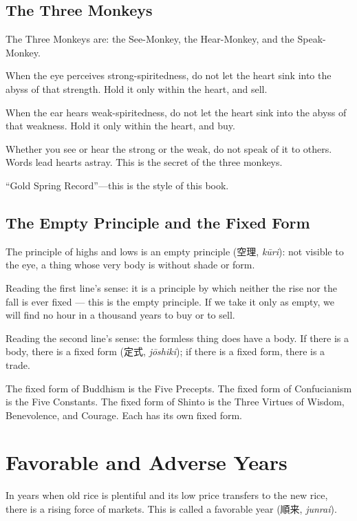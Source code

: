 \documentclass[10pt, openany]{book}
\newcommand{\jp}[1]{{\japanesefont #1}}
\begin{document}
\section{The Three Monkeys}

The Three Monkeys are: the See-Monkey, the Hear-Monkey, and the
Speak-Monkey.

When the eye perceives strong-spiritedness, do not let the heart
sink into the abyss of that strength. Hold it only within the
heart, and sell.

When the ear hears weak-spiritedness, do not let the heart sink
into the abyss of that weakness. Hold it only within the heart,
and buy.

Whether you see or hear the strong or the weak, do not speak of it
to others. Words lead hearts astray. This is the secret of the
three monkeys.

``Gold Spring Record''---this is the style of this book.

\section{The Empty Principle and the Fixed Form}

The principle of highs and lows is an empty principle
(\jp{空理}, \textit{k\=uri}): not visible to the eye, a thing whose
very body is without shade or form.

Reading the first line's sense: it is a principle by which neither
the rise nor the fall is ever fixed --- this is the empty principle.
If we take it only as empty, we will find no hour in a thousand
years to buy or to sell.

Reading the second line's sense: the formless thing does have a
body. If there is a body, there is a fixed form (\jp{定式},
\textit{j\=oshiki}); if there is a fixed form, there is a trade.

The fixed form of Buddhism is the Five Precepts. The fixed form of
Confucianism is the Five Constants. The fixed form of Shinto is the
Three Virtues of Wisdom, Benevolence, and Courage. Each has its own
fixed form.

\chapter{Favorable and Adverse Years}

In years when old rice is plentiful and its low price transfers to
the new rice, there is a rising force of markets. This is called a
favorable year (\jp{順来}, \textit{junrai}).
\end{document}
